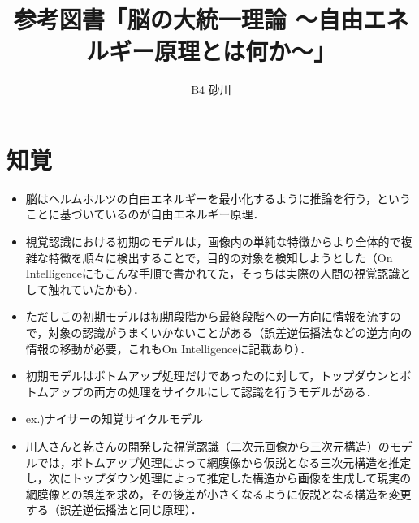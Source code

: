 \documentclass[a4paper, titlepage]{jsarticle}
\title{\Huge 参考図書「脳の大統一理論 ～自由エネルギー原理とは何か～」}
\author{B4 砂川}
\begin{document}
\maketitle

\section{知覚}
\begin{itemize}
    \item 脳はヘルムホルツの自由エネルギーを最小化するように推論を行う，ということに基づいているのが自由エネルギー原理．
    \item 視覚認識における初期のモデルは，画像内の単純な特徴からより全体的で複雑な特徴を順々に検出することで，目的の対象を検知しようとした（On Intelligenceにもこんな手順で書かれてた，そっちは実際の人間の視覚認識として触れていたかも）．
    \item ただしこの初期モデルは初期段階から最終段階への一方向に情報を流すので，対象の認識がうまくいかないことがある（誤差逆伝播法などの逆方向の情報の移動が必要，これもOn Intelligenceに記載あり）．
    \item 初期モデルはボトムアップ処理だけであったのに対して，トップダウンとボトムアップの両方の処理をサイクルにして認識を行うモデルがある．
    \item ex.)ナイサーの知覚サイクルモデル
    \item 川人さんと乾さんの開発した視覚認識（二次元画像から三次元構造）のモデルでは，ボトムアップ処理によって網膜像から仮説となる三次元構造を推定し，次にトップダウン処理によって推定した構造から画像を生成して現実の網膜像との誤差を求め，その後差が小さくなるように仮説となる構造を変更する（誤差逆伝播法と同じ原理）．
\end{itemize}
\end{document}
